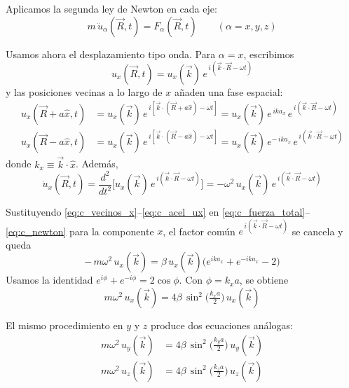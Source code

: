 \documentclass{article}
\begin{document}
Aplicamos la segunda ley de Newton en cada eje:
\begin{equation}
m\,\ddot u_\alpha(\vec R,t)=F_\alpha(\vec R,t)\qquad(\alpha=x,y,z)
\label{eq:c_newton}
\end{equation}

Usamos ahora el desplazamiento tipo onda. Para \(\alpha=x\), escribimos
\begin{equation}
u_x(\vec R,t)=u_x(\vec k)\,e^{\,i(\vec k\cdot\vec R-\omega t)}
\label{eq:c_ansatz_ux}
\end{equation}
y las posiciones vecinas a lo largo de \(x\) añaden una fase espacial:
\begin{equation}
\begin{aligned}
u_x(\vec R{+}a\hat x,t)&=u_x(\vec k)\,e^{\,i[\vec k\cdot(\vec R{+}a\hat x)-\omega t]}
= u_x(\vec k)\,e^{\,ika_x}\,e^{\,i(\vec k\cdot\vec R-\omega t)}\\[4pt]
u_x(\vec R{-}a\hat x,t)&=u_x(\vec k)\,e^{\,i[\vec k\cdot(\vec R{-}a\hat x)-\omega t]}
= u_x(\vec k)\,e^{-\,ika_x}\,e^{\,i(\vec k\cdot\vec R-\omega t)}
\end{aligned}
\label{eq:c_vecinos_x}
\end{equation}
donde \(k_x\equiv\vec k\cdot\hat x\). Además,
\begin{equation}
\ddot u_x(\vec R,t)=\frac{d^2}{dt^2}\Big[u_x(\vec k)\,e^{\,i(\vec k\cdot\vec R-\omega t)}\Big]
=-\omega^2\,u_x(\vec k)\,e^{\,i(\vec k\cdot\vec R-\omega t)}
\label{eq:c_acel_ux}
\end{equation}

Sustituyendo \eqref{eq:c_vecinos_x}–\eqref{eq:c_acel_ux} en \eqref{eq:c_fuerza_total}–\eqref{eq:c_newton} para la componente \(x\), el factor común \(e^{\,i(\vec k\cdot\vec R-\omega t)}\) se cancela y queda
\begin{equation}
-\,m\omega^2\,u_x(\vec k)=\beta\,u_x(\vec k)\Big(e^{ika_x}+e^{-ika_x}-2\Big)
\label{eq:c_matriz_x_paso1}
\end{equation}
Usamos la identidad \(e^{i\phi}+e^{-i\phi}=2\cos\phi\). Con \(\phi\!=\!k_x a\), se obtiene
\begin{equation}
m\omega^2\,u_x(\vec k)=4\beta\,\sin^2\!\Big(\tfrac{k_x a}{2}\Big)\,u_x(\vec k)
\label{eq:c_matriz_x}
\end{equation}

El mismo procedimiento en \(y\) y \(z\) produce dos ecuaciones análogas:
\begin{equation}
\begin{aligned}
m\omega^2\,u_y(\vec k)&=4\beta\,\sin^2\!\Big(\tfrac{k_y a}{2}\Big)\,u_y(\vec k)\\[4pt]
m\omega^2\,u_z(\vec k)&=4\beta\,\sin^2\!\Big(\tfrac{k_z a}{2}\Big)\,u_z(\vec k)
\end{aligned}
\label{eq:c_matriz_yz}
\end{equation}
\end{document}
